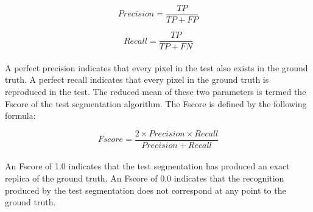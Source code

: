 \begin{equation}
Precision = \frac{TP}{TP + FP}
\end{equation}

\begin{equation}
Recall = \frac{TP}{TP + FN}
\end{equation}
\\
A perfect precision indicates that every pixel in the test also exists in the ground truth. A perfect recall indicates that every pixel in the ground truth is reproduced in the test. The reduced mean of these two parameters is termed the Fscore of the test segmentation algorithm. The Fscore is defined by the following formula:

\begin{equation}
Fscore = \frac{2 \times Precision \times Recall}{Precision + Recall}
\end{equation}
\\
An Fscore of 1.0 indicates that the test segmentation has produced an exact replica of the ground truth. An Fscore of 0.0 indicates that the recognition produced by the test segmentation does not correspond at any point to the ground truth.
